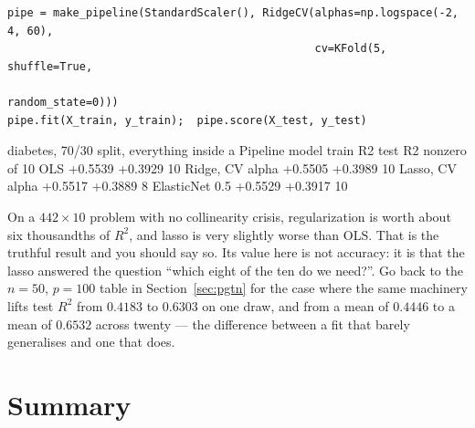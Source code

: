 \documentclass[11pt]{article}
\begin{document}
\begin{lstlisting}
pipe = make_pipeline(StandardScaler(), RidgeCV(alphas=np.logspace(-2, 4, 60),
                                               cv=KFold(5, shuffle=True,
                                                        random_state=0)))
pipe.fit(X_train, y_train);  pipe.score(X_test, y_test)
\end{lstlisting}
\begin{codeout}
diabetes, 70/30 split, everything inside a Pipeline
  model              train R2   test R2   nonzero of 10
  OLS                 +0.5539   +0.3929        10
  Ridge, CV alpha     +0.5505   +0.3989        10
  Lasso, CV alpha     +0.5517   +0.3889         8
  ElasticNet 0.5      +0.5529   +0.3917        10
\end{codeout}

\begin{caution}
On a $442\times10$ problem with no collinearity crisis, regularization is
worth about six thousandths of $R^2$, and lasso is very slightly worse than
OLS. That is the truthful result and you should say so. Its value here is not
accuracy: it is that the lasso answered the question ``which eight of the ten
do we need?''. Go back to the $n = 50$, $p = 100$ table in
Section~\ref{sec:pgtn} for the case where the same machinery lifts test
$R^2$ from $0.4183$ to $0.6303$ on one draw, and from a mean of $0.4446$ to a
mean of $0.6532$ across twenty --- the difference between a fit that barely
generalises and one that does.
\end{caution}

\section{Summary}
\end{document}
